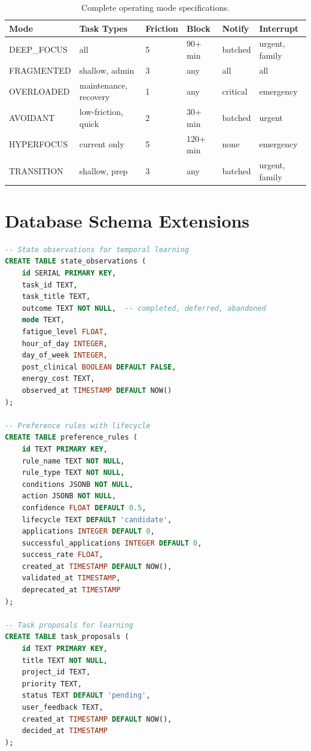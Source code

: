 \documentclass[11pt,a4paper]{article}
\begin{document}
\begin{table}[h]
\centering
\caption{Complete operating mode specifications.}
\begin{tabular}{llllll}
\toprule
\textbf{Mode} & \textbf{Task Types} & \textbf{Friction} & \textbf{Block} & \textbf{Notify} & \textbf{Interrupt} \\
\midrule
DEEP\_FOCUS & all & 5 & 90+ min & batched & urgent, family \\
FRAGMENTED & shallow, admin & 3 & any & all & all \\
OVERLOADED & maintenance, recovery & 1 & any & critical & emergency \\
AVOIDANT & low-friction, quick & 2 & 30+ min & batched & urgent \\
HYPERFOCUS & current only & 5 & 120+ min & none & emergency \\
TRANSITION & shallow, prep & 3 & any & batched & urgent, family \\
\bottomrule
\end{tabular}
\end{table}

\section{Database Schema Extensions}
\label{app:schema_ext}

\begin{lstlisting}[language=SQL,caption={Learning system tables}]
-- State observations for temporal learning
CREATE TABLE state_observations (
    id SERIAL PRIMARY KEY,
    task_id TEXT,
    task_title TEXT,
    outcome TEXT NOT NULL,  -- completed, deferred, abandoned
    mode TEXT,
    fatigue_level FLOAT,
    hour_of_day INTEGER,
    day_of_week INTEGER,
    post_clinical BOOLEAN DEFAULT FALSE,
    energy_cost TEXT,
    observed_at TIMESTAMP DEFAULT NOW()
);

-- Preference rules with lifecycle
CREATE TABLE preference_rules (
    id TEXT PRIMARY KEY,
    rule_name TEXT NOT NULL,
    rule_type TEXT NOT NULL,
    conditions JSONB NOT NULL,
    action JSONB NOT NULL,
    confidence FLOAT DEFAULT 0.5,
    lifecycle TEXT DEFAULT 'candidate',
    applications INTEGER DEFAULT 0,
    successful_applications INTEGER DEFAULT 0,
    success_rate FLOAT,
    created_at TIMESTAMP DEFAULT NOW(),
    validated_at TIMESTAMP,
    deprecated_at TIMESTAMP
);

-- Task proposals for learning
CREATE TABLE task_proposals (
    id TEXT PRIMARY KEY,
    title TEXT NOT NULL,
    project_id TEXT,
    priority TEXT,
    status TEXT DEFAULT 'pending',
    user_feedback TEXT,
    created_at TIMESTAMP DEFAULT NOW(),
    decided_at TIMESTAMP
);
\end{lstlisting}
\end{document}
